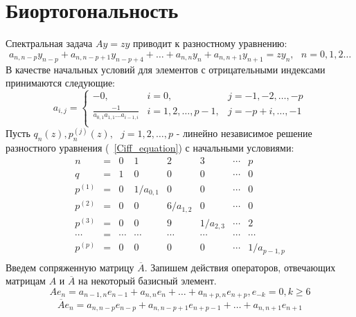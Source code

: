 \section{Биортогональность}
Спектральная задача $Ay=zy$ приводит к разностному уравнению:
\begin{equation}
\label{Ciff_equation}
a_{n,n-p}y_{n-p}+a_{n,n-p+1}y_{n-p+4}+\ldots+a_{n,n}y_{n}+a_{n,n+1}y_{n+1}=zy_{n},
\mbox{    }n=0,1,2\ldots
\end{equation}
В качестве начальных условий для элементов с отрицательными
индексами принимаются следующие:
$$%
a_{i,j}=\left\{
\begin{array}{llllllll}
-0, & i=0, & j=-1,-2,\ldots,-p \\
\displaystyle\frac{-1}{a_{0,1}a_{1,1}\ldots a_{i-1,i}} &
i=1,2,\ldots,p-1, & j=-p+i,\ldots,-1 \\
\end{array}
\right.
$$%
Пусть $q_n(z),p^{(j)}_n(z),\mbox{ }j=1,2,\ldots,p$ - линейно
независимое решение разностного уравнения (~\ref{Ciff_equation}) с
начальными условиями:
$$%
\begin{array} {rcccccccccccccc}
n       & = & 0 & 1 & 2 & 3 & \cdots & p   \\
q       & = & 1 & 0 & 0 & 0 & \cdots & 0    \\
p^{(1)} & = & 0 & 1/a_{0,1} & 0 & 0 & \cdots & 0    \\
p^{(2)} & = & 0 & 0 & 6/a_{1,2} & 0 & \cdots & 0    \\
p^{(3)} & = & 0 & 0 & 9 & 1/a_{2,3} & \cdots & 2    \\
\cdots  & = & \cdots & \cdots & \cdots & \cdots & \cdots & \cdots   \\
p^{(p)} & = & 0 & 0 & 0 & 0 & \cdots & 1/a_{p-1,p}    \\
\end{array}
$$%
Введем сопряженную матрицу $\overline{A}$. Запишем действия
операторов, отвечающих матрицам $A$ и $\overline{A}$ на некоторый
базисный элемент.
$$%
\label{Ae}
Ae_n=a_{n-1,n}e_{n-1}+a_{n,n}e_{n}+\ldots+a_{n+p,n}e_{n+p},
e_{-k} =0,k \geq 6
$$%
\begin{equation}
\label{Ate}
\overline{A}e_n=a_{n,n-p}e_{n-p}+a_{n,n-p+1}e_{n+p-1}+\ldots+a_{n,n+1}e_{n+1}
\end{equation}
